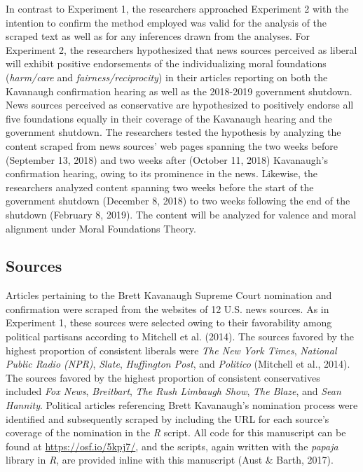 \documentclass[english,,man]{apa6}
\begin{document}
In contrast to Experiment 1, the researchers approached Experiment 2 with the intention to confirm the method employed was valid for the analysis of the scraped text as well as for any inferences drawn from the analyses. For Experiment 2, the researchers hypothesized that news sources perceived as liberal will exhibit positive endorsements of the individualizing moral foundations (\emph{harm/care} and \emph{fairness/reciprocity}) in their articles reporting on both the Kavanaugh confirmation hearing as well as the 2018-2019 government shutdown. News sources perceived as conservative are hypothesized to positively endorse all five foundations equally in their coverage of the Kavanaugh hearing and the government shutdown. The researchers tested the hypothesis by analyzing the content scraped from news sources' web pages spanning the two weeks before (September 13, 2018) and two weeks after (October 11, 2018) Kavanaugh's confirmation hearing, owing to its prominence in the news. Likewise, the researchers analyzed content spanning two weeks before the start of the government shutdown (December 8, 2018) to two weeks following the end of the shutdown (February 8, 2019). The content will be analyzed for valence and moral alignment under Moral Foundations Theory.

\hypertarget{sources-1}{%
\subsection{Sources}\label{sources-1}}

Articles pertaining to the Brett Kavanaugh Supreme Court nomination and confirmation were scraped from the websites of 12 U.S. news sources. As in Experiment 1, these sources were selected owing to their favorability among political partisans according to Mitchell et al. (2014). The sources favored by the highest proportion of consistent liberals were \emph{The New York Times}, \emph{National Public Radio (NPR)}, \emph{Slate}, \emph{Huffington Post}, and \emph{Politico} (Mitchell et al., 2014). The sources favored by the highest proportion of consistent conservatives included \emph{Fox News}, \emph{Breitbart}, \emph{The Rush Limbaugh Show}, \emph{The Blaze}, and \emph{Sean Hannity}. Political articles referencing Brett Kavanaugh's nomination process were identified and subsequently scraped by including the URL for each source's coverage of the nomination in the \emph{R} script. All code for this manuscript can be found at \url{https://osf.io/5kpj7/}, and the scripts, again written with the \emph{papaja} library in \emph{R}, are provided inline with this manuscript (Aust \& Barth, 2017).
\end{document}
